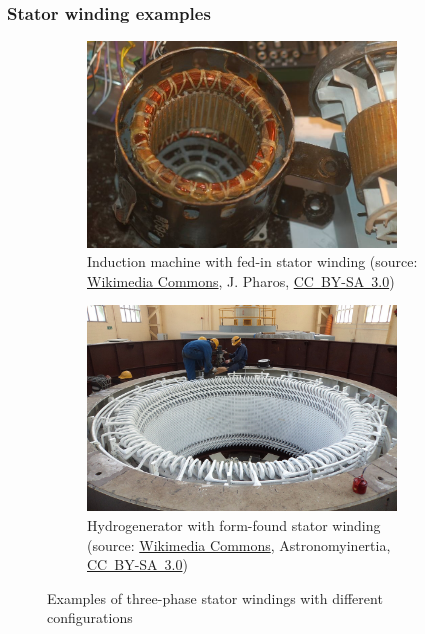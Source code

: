 \begin{frame}
	\frametitle{Stator winding examples}
    \begin{figure}
		\centering
		\begin{subfigure}[b]{0.49\textwidth}
			\centering
			\includegraphics[width=0.9\textwidth]{fig/lec05/Squirrel_motor_winding.jpg}
			\caption{Induction machine with fed-in stator winding  (source: \href{https://commons.wikimedia.org/wiki/File:Kommutator_eines_Universalmotor.JPGg}{Wikimedia Commons}, J. Pharos, \href{https://creativecommons.org/licenses/by-sa/3.0/deed.en}{CC~BY-SA~3.0})}
		\end{subfigure}
		\hfill
		\begin{subfigure}[b]{0.49\textwidth}
			\centering
			\includegraphics[width=0.9\textwidth]{fig/lec05/Stator_winding_at_WPS.jpg}
			\caption{Hydrogenerator with form-found stator winding (source: \href{https://commons.wikimedia.org/wiki/File:Stator_winding_at_WPS.JPG}{Wikimedia Commons},  	Astronomyinertia, \href{https://creativecommons.org/licenses/by-sa/3.0/deed.en}{CC~BY-SA~3.0})}
		\end{subfigure}
		\caption{Examples of three-phase stator windings with different configurations} 
        \label{fig:Stator_windings_examples}
	\end{figure}
\end{frame}

